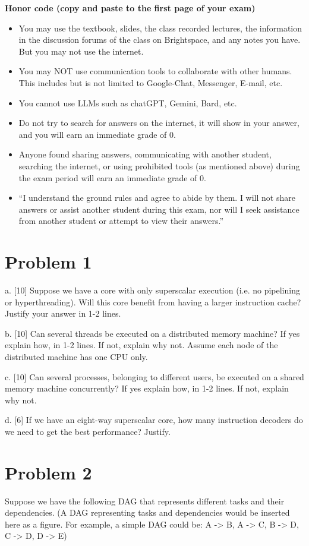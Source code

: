 \documentclass{article}
\begin{document}
\textbf{Honor code (copy and paste to the first page of your exam)}
\begin{itemize}
    \item You may use the textbook, slides, the class recorded lectures, the information in the discussion forums of the class on Brightspace, and any notes you have. But you may not use the internet.
    \item You may NOT use communication tools to collaborate with other humans. This includes but is not limited to Google-Chat, Messenger, E-mail, etc.
    \item You cannot use LLMs such as chatGPT, Gemini, Bard, etc.
    \item Do not try to search for answers on the internet, it will show in your answer, and you will earn an immediate grade of 0.
    \item Anyone found sharing answers, communicating with another student, searching the internet, or using prohibited tools (as mentioned above) during the exam period will earn an immediate grade of 0.
    \item “I understand the ground rules and agree to abide by them. I will not share answers or assist another student during this exam, nor will I seek assistance from another student or attempt to view their answers.”
\end{itemize}

\section*{Problem 1}
a. [10] Suppose we have a core with only superscalar execution (i.e. no pipelining or hyperthreading). Will this core benefit from having a larger instruction cache? Justify your answer in 1-2 lines.

b. [10] Can several threads be executed on a distributed memory machine? If yes explain how, in 1-2 lines. If not, explain why not. Assume each node of the distributed machine has one CPU only.

c. [10] Can several processes, belonging to different users, be executed on a shared memory machine concurrently? If yes explain how, in 1-2 lines. If not, explain why not.

d. [6] If we have an eight-way superscalar core, how many instruction decoders do we need to get the best performance? Justify.


\section*{Problem 2}
Suppose we have the following DAG that represents different tasks and their dependencies.  (A DAG representing tasks and dependencies would be inserted here as a figure.  For example, a simple DAG could be: A -> B, A -> C, B -> D, C -> D, D -> E)
\end{document}
